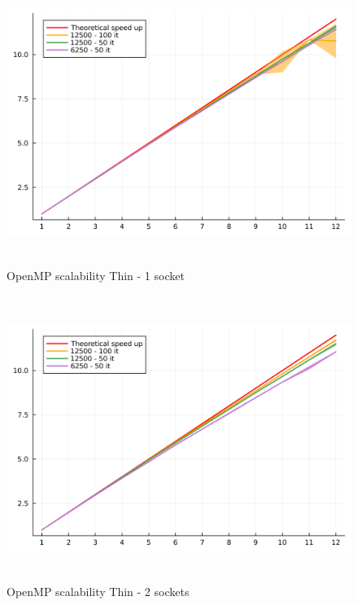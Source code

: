 \documentclass[
  letterpaper,
  DIV=11,
  numbers=noendperiod]{scrartcl}
\begin{document}
\begin{figure}

{\centering \includegraphics[width=\textwidth,height=3.64583in]{img/thin_1_socket.png}

}

\caption{OpenMP scalability Thin - 1 socket}

\end{figure}

\begin{figure}

{\centering \includegraphics[width=\textwidth,height=3.64583in]{img/thin_2_sockets.png}

}

\caption{OpenMP scalability Thin - 2 sockets}

\end{figure}
\end{document}
